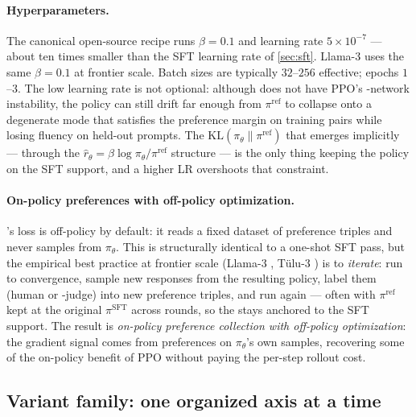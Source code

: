 \paragraph{Hyperparameters.} The canonical open-source recipe
\citep{tulu3} runs $\beta = 0.1$ and learning rate
$5 \times 10^{-7}$ --- about ten times smaller than the SFT learning
rate of \cref{sec:sft}. Llama-3 \citep{meta-llama3} uses the same
$\beta = 0.1$ at frontier scale. Batch sizes are typically
$32$--$256$ effective; epochs $1$--$3$. The low learning rate is not
optional: although  does not have PPO's -network instability,
the policy can still drift far enough from $\pi^{\mathrm{ref}}$ to
collapse onto a degenerate mode that satisfies the preference margin on
training pairs while losing fluency on held-out prompts. The
$\mathrm{KL}(\pi_\theta \| \pi^{\mathrm{ref}})$ that emerges
implicitly --- through the $\hat r_\theta = \beta \log \pi_\theta /
\pi^{\mathrm{ref}}$ structure --- is the only thing keeping the policy
on the SFT support, and a higher LR overshoots that constraint.

\paragraph{On-policy preferences with off-policy optimization.} 's
loss is off-policy by default: it reads a fixed dataset of preference
triples and never samples from $\pi_\theta$. This is structurally
identical to a one-shot SFT pass, but the empirical best practice at
frontier scale (Llama-3 \citep{meta-llama3}, T\"ulu-3 \citep{tulu3}) is
to \emph{iterate}: run  to convergence, sample new responses from
the resulting policy, label them (human or -judge) into new
preference triples, and run  again --- often with
$\pi^{\mathrm{ref}}$ kept at the original $\pi^{\mathrm{SFT}}$ across
rounds, so the  stays anchored to the SFT support. The
result is \emph{on-policy preference collection with off-policy
optimization}: the gradient signal comes from preferences on
$\pi_\theta$'s own samples, recovering some of the on-policy benefit
of PPO without paying the per-step rollout cost.

\subsection{Variant family: one organized axis at a time}
\label{sec:dpo-variants}

